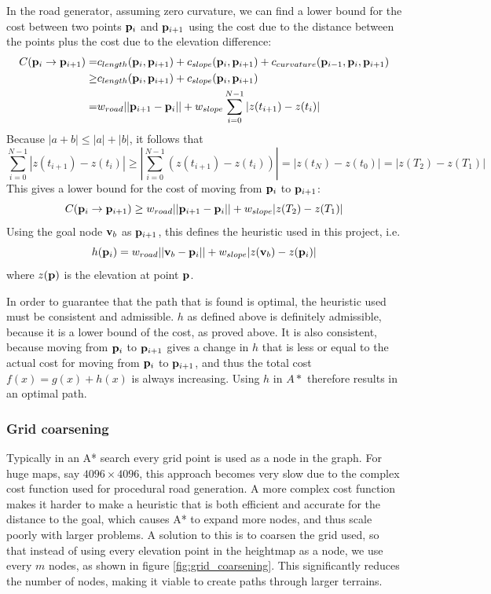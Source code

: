 In the road generator, assuming zero curvature, we can find a lower bound for the cost between two points ${\mathbf p}_i$ and ${\mathbf p}_{i+1}$ using the cost due to the distance between the points plus the cost due to the elevation difference:
\begin{align*}
C({\mathbf p}_i \to {\mathbf p}_{i+1}) = & c_{length}({\mathbf p}_i, {\mathbf p}_{i+1}) + c_{slope}({\mathbf p}_i, {\mathbf p}_{i+1}) + c_{curvature}({\mathbf p}_{i-1}, {\mathbf p}_i, {\mathbf p}_{i+1})\\
                                 \geq & c_{length}({\mathbf p}_i, {\mathbf p}_{i+1}) + c_{slope}({\mathbf p}_i, {\mathbf p}_{i+1}) \\
                                 = & w_{road}||{\mathbf p}_{i+1} - {\mathbf p}_i|| + w_{slope}\sum_{i=0}^{N-1} |z(t_{i+1})-z(t_i)|
\end{align*}
Because $|a+b| \leq |a|+|b|$, it follows that
$$
\sum_{i=0}^{N-1} |z(t_{i+1})-z(t_i)| \geq \left|\sum_{i=0}^{N-1} (z(t_{i+1})-z(t_i))\right| = |z(t_{N})-z(t_0)| = |z(T_2)-z(T_1)|
$$
This gives a lower bound for the cost of moving from ${\mathbf p}_i$ to ${\mathbf p}_{i+1}$:
$$
C({\mathbf p}_i \to {\mathbf p}_{i+1}) \geq w_{road}||{\mathbf p}_{i+1} - {\mathbf p}_i|| + w_{slope}|z(T_2)-z(T_1)|
$$
Using the goal node ${\mathbf v}_b$ as ${\mathbf p}_{i+1}$, this defines the heuristic used in this project, i.e.
\begin{equation}
h({\mathbf p}_i) = w_{road}||{\mathbf v}_b - {\mathbf p}_i|| + w_{slope}|z({\mathbf v}_b)-z({\mathbf p}_i)|
\label{eq:astar_heuristic}
\end{equation}
where $z({\mathbf p})$ is the elevation at point ${\mathbf p}$.

In order to guarantee that the path that is found is optimal, the heuristic used must be consistent and admissible. $h$ as defined above is definitely admissible, because it is a lower bound of the cost, as proved above. It is also consistent, because moving from ${\mathbf p}_i$ to ${\mathbf p}_{i+1}$ gives a change in $h$ that is less or equal to the actual cost for moving from ${\mathbf p}_i$ to ${\mathbf p}_{i+1}$, and thus the total cost $f(x) = g(x)+h(x)$ is always increasing. Using $h$ in $A*$ therefore results in an optimal path.

\subsubsection{Grid coarsening}
Typically in an A* search every grid point is used as a node in the graph. For huge maps, say $4096\times 4096$, this approach becomes very slow due to the complex cost function used for procedural road generation. A more complex cost function makes it harder to make a heuristic that is both efficient and accurate for the distance to the goal, which causes A* to expand more nodes, and thus scale poorly with larger problems. A solution to this is to coarsen the grid used, so that instead of using every elevation point in the heightmap as a node, we use every $m$ nodes, as shown in figure \ref{fig:grid_coarsening}. This significantly reduces the number of nodes, making it viable to create paths through larger terrains.

